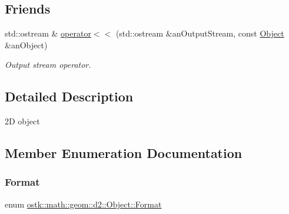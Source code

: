 \subsection*{Friends}
\begin{DoxyCompactItemize}
\item 
std\+::ostream \& \hyperlink{classostk_1_1math_1_1geom_1_1d2_1_1_object_a418df9bf4a73078f3d494edef1743f8d}{operator$<$$<$} (std\+::ostream \&an\+Output\+Stream, const \hyperlink{classostk_1_1math_1_1geom_1_1d2_1_1_object}{Object} \&an\+Object)
\begin{DoxyCompactList}\small\item\em Output stream operator. \end{DoxyCompactList}\end{DoxyCompactItemize}


\subsection{Detailed Description}
2D object 

\subsection{Member Enumeration Documentation}
\mbox{\label{classostk_1_1math_1_1geom_1_1d2_1_1_object_aa76f9e30caebf4005bafbdff447f66cf}} 
\subsubsection{\texorpdfstring{Format}{Format}}
{\footnotesize\ttfamily enum \hyperlink{classostk_1_1math_1_1geom_1_1d2_1_1_object_aa76f9e30caebf4005bafbdff447f66cf}{ostk\+::math\+::geom\+::d2\+::\+Object\+::\+Format}\hspace{0.3cm}{\ttfamily [strong]}}

